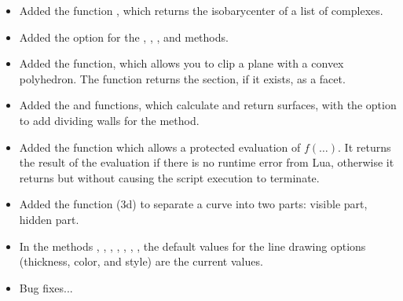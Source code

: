 \begin{itemize}
    \item Added the function , which returns the isobarycenter of a list of complexes.

    \item Added the  option for the , , , and  methods.

    \item Added the  function, which allows you to clip a plane with a convex polyhedron. The function returns the section, if it exists, as a facet.

    \item Added the  and  functions, which calculate and return surfaces, with the option to add dividing walls for the  method.     

    \item Added the function  which allows a protected evaluation of $f(\ldots)$. It returns the result of the evaluation if there is no runtime error from Lua, otherwise it returns \nil but without causing the script execution to terminate.

    \item Added the function  (3d) to separate a curve into two parts: visible part, hidden part.

    \item In the methods , , , , , , , the default values ​​for the line drawing options (thickness, color, and style) are the current values.
    \item Bug fixes...
\end{itemize}    

